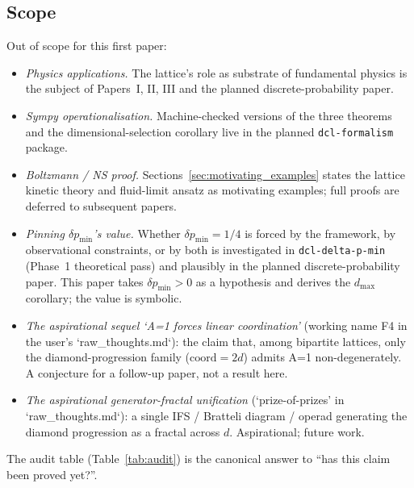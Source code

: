 \subsection{Scope}
\label{subsec:scope}

Out of scope for this first paper:

\begin{itemize}
\item \emph{Physics applications.}  The lattice's role as substrate
      of fundamental physics is the subject of Papers~I, II, III and
      the planned discrete-probability paper.
\item \emph{Sympy operationalisation.}  Machine-checked versions of
      the three theorems and the dimensional-selection corollary
      live in the planned \texttt{dcl-formalism} package.
\item \emph{Boltzmann / NS proof.}  Sections~\ref{sec:motivating_examples}
      states the lattice kinetic theory and fluid-limit ansatz as
      motivating examples; full proofs are deferred to subsequent
      papers.
\item \emph{Pinning $\delta p_\min$'s value.}  Whether
      $\delta p_\min = 1/4$ is forced by the framework, by
      observational constraints, or by both is investigated in
      \texttt{dcl-delta-p-min} (Phase~1 theoretical pass) and
      plausibly in the planned discrete-probability paper.  This
      paper takes $\delta p_\min > 0$ as a hypothesis and derives
      the $d_{\max}$ corollary; the value is symbolic.
\item \emph{The aspirational sequel `A=1 forces linear coordination'}
      (working name F4 in the user's `raw_thoughts.md`): the claim
      that, among bipartite lattices, only the diamond-progression
      family ($\text{coord} = 2d$) admits A=1 non-degenerately.  A
      conjecture for a follow-up paper, not a result here.
\item \emph{The aspirational generator-fractal unification}
      (`prize-of-prizes' in `raw_thoughts.md`): a single
      IFS / Bratteli diagram / operad generating the diamond
      progression as a fractal across $d$.  Aspirational; future
      work.
\end{itemize}

The audit table (Table~\ref{tab:audit}) is the canonical answer to
``has this claim been proved yet?''.


